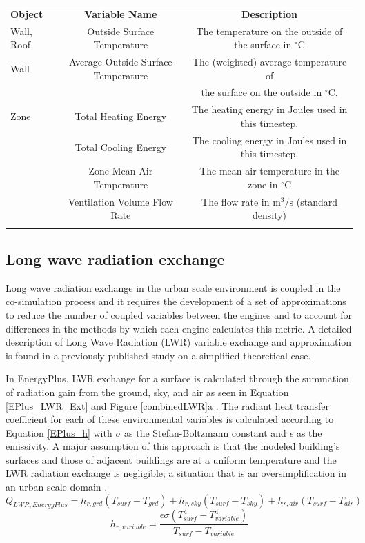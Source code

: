 \documentclass{tBPS2e}
\theoremstyle{plain}
\theoremstyle{definition}
\theoremstyle{remark}
\begin{document}
\begin{table}[H]
{\begin{tabular}[l]{@{}lcc}\toprule
  \bf{Object} &  \bf{Variable Name} & \bf{Description} \\
\colrule
Wall, Roof & Outside Surface Temperature & The temperature on the outside of the surface in $^{\circ}\mathrm{C}$ \\    
    \hline
Wall & Average Outside Surface Temperature & The (weighted) average temperature of \\
& & the surface on the outside in $^{\circ}\mathrm{C}$. \\
    \hline
Zone & Total Heating Energy & The heating energy in Joules used in this timestep. \\
& Total Cooling Energy & The cooling energy in Joules used in this timestep. \\
& Zone Mean Air Temperature & The mean air temperature in the zone in $^{\circ}\mathrm{C}$ \\
& Ventilation Volume Flow Rate & The flow rate in $\mathrm{m}^3/\mathrm{s}$ (standard density) \\
\botrule
\end{tabular}}
\label{FMUexports}
\end{table}

\subsection{Long wave radiation exchange}

Long wave radiation exchange in the urban scale environment is coupled in the co-simulation process and it requires the development of a set of approximations to reduce the number of coupled variables between the engines and to account for differences in the methods by which each engine calculates this metric. A detailed description of Long Wave Radiation (LWR) variable exchange and approximation is found in a previously published study \citep{Miller:2015vk} on a simplified theoretical case. 

In EnergyPlus, LWR exchange for a surface is calculated through the summation of radiation gain from the ground, sky, and air as seen in Equation \ref{EPlus_LWR_Ext} and Figure \ref{combinedLWR}a \citep{doe2010energyplus}. The radiant heat transfer coefficient for each of these environmental variables is calculated according to Equation \ref{EPlus_h} with $\sigma$ as the Stefan-Boltzmann constant and $\epsilon$ as the emissivity. A major assumption of this approach is that the modeled building's surfaces and those of adjacent buildings are at a uniform temperature and the LWR radiation exchange is negligible; a situation that is an oversimplification in an urban
scale domain \citep{Evins:2014cf}.
\begin{equation} \label{EPlus_LWR_Ext} 
Q_{LWR,EnergyPlus} = h_{r,grd}(T_{surf}-T_{grd}) + h_{r,sky}(T_{surf}-T_{sky}) + h_{r,air}(T_{surf}-T_{air})
\end{equation}
\begin{equation} \label{EPlus_h} 
h_{r,variable} = \frac{\epsilon\sigma(T^{4}_{surf}-T^{4}_{variable})}{T_{surf}-T_{variable}}
\end{equation}
\end{document}
